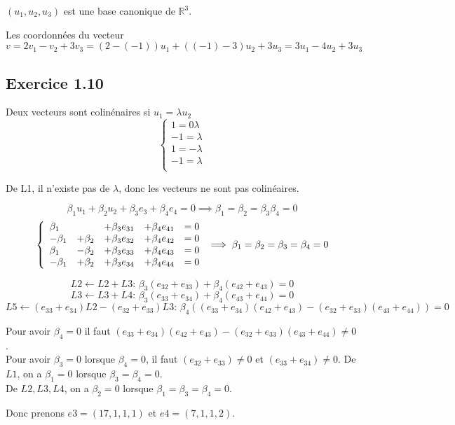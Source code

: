 \documentclass[]{book}
\theoremstyle{definition}
\newcommand{\bb}[1]{\mathbb{#1}}
\newcommand{\R}{\bb{R}}
\begin{document}
$(u_1, u_2, u_3)$ est une base canonique de $\R^3$.

Les coordonn\'ees du vecteur $v=2v_1-v_2+3v_3 = (2-(-1))u_1 + ((-1)-3)u_2 + 3u_3 = 3u_1 -4 u_2 + 3u_3$ 

\subsection*{Exercice 1.10}
Deux vecteurs sont colin\'enaires si $u_1 = \lambda u_2$
$$
\left\{ 
\begin{array}{l}
   1 = 0 \lambda\\
   -1 = \lambda \\
   1 = -\lambda \\
   -1 = \lambda \\
\end{array}
\right.
$$

De L1, il n'existe pas de $\lambda$, donc les vecteurs ne sont pas colin\'eaires.

$$
\beta_1 u_{1} +\beta_2 u_{2} + \beta_3 e_{3} + \beta_4 e_{4} = 0
\implies
\beta_1=\beta_2=\beta_3\beta_4=0
$$
$$
\left\{ 
\begin{array}{l l l l l}
  \beta_1  &          & +\beta_3 e_{31} & +\beta_4 e_{41} & = 0 \\
  -\beta_1 & +\beta_2 & +\beta_3 e_{32} & +\beta_4 e_{42} & = 0 \\
  \beta_1  & -\beta_2 & +\beta_3 e_{33} & +\beta_4 e_{43} & = 0 \\
  -\beta_1 & +\beta_2 & +\beta_3 e_{34} & +\beta_4 e_{44} & = 0 \\
\end{array}
\right. 
\implies
\beta_1=\beta_2=\beta_3=\beta_4=0
$$

$$L2 \leftarrow L2+L3:\, \beta_3(e_{32}+e_{33}) + \beta_4(e_{42}+e_{43}) = 0$$
$$L3 \leftarrow L3+L4:\, \beta_3(e_{33}+e_{34}) + \beta_4(e_{43}+e_{44}) = 0$$
$$L5 \leftarrow (e_{33}+e_{34})L2 - (e_{32}+e_{33})L3:\, \beta_4 ((e_{33}+e_{34})(e_{42}+e_{43}) - (e_{32}+e_{33})(e_{43}+e_{44})) = 0$$

Pour avoir $\beta_4 = 0$ il faut $(e_{33}+e_{34})(e_{42}+e_{43}) - (e_{32}+e_{33})(e_{43}+e_{44})\neq 0$.\\
Pour avoir $\beta_3 = 0$ lorsque $\beta_4 = 0$, il faut $(e_{32}+e_{33}) \neq 0$ et $(e_{33}+e_{34}) \neq 0$.
De $L1$, on a $\beta_1 = 0$ lorsque $\beta_3 = \beta_4 = 0$.\\
De $L2,L3,L4$, on a $\beta_2 = 0$ lorsque $\beta_1 = \beta_3 = \beta_4 = 0$.

Donc prenons $e3 = (17,1,1,1)$ et $e4=(7,1,1,2)$.
\end{document}
